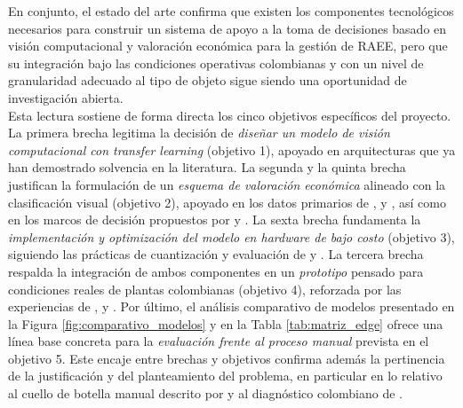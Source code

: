 En conjunto, el estado del arte confirma que existen los componentes tecnológicos necesarios para construir un sistema de apoyo a la toma de decisiones basado en visión computacional y valoración económica para la gestión de RAEE, pero que su integración bajo las condiciones operativas colombianas y con un nivel de granularidad adecuado al tipo de objeto sigue siendo una oportunidad de investigación abierta.\\

Esta lectura sostiene de forma directa los cinco objetivos específicos del proyecto. La primera brecha legitima la decisión de \emph{diseñar un modelo de visión computacional con \textit{transfer learning}} (objetivo 1), apoyado en arquitecturas que ya han demostrado solvencia en la literatura. La segunda y la quinta brecha justifican la formulación de un \emph{esquema de valoración económica} alineado con la clasificación visual (objetivo 2), apoyado en los datos primarios de \cite{cespiLCAPreciousMetals2025}, \cite{wangEwasteRecyclingIntegrated2025} y \cite{qinPreciousMetalRecycling2025}, así como en los marcos de decisión propuestos por \cite{seikhIdentifyingSustainableStrategies2024} y \cite{venegasmarcelModeloProcedimentalPara2020}. La sexta brecha fundamenta la \emph{implementación y optimización del modelo en hardware de bajo costo} (objetivo 3), siguiendo las prácticas de cuantización y evaluación de \cite{zagitovComparativeAnalysisNeural2024} y \cite{alqahtaniBenchmarkingDeepLearning2024}. La tercera brecha respalda la integración de ambos componentes en un \emph{prototipo} pensado para condiciones reales de plantas colombianas (objetivo 4), reforzada por las experiencias de \cite{a.ceronRecyclableWasteClassification2025a}, \cite{ilievEmbeddedSystemEwaste2023} y \cite{p.sLowPowerEdgeAI2026}. Por último, el análisis comparativo de modelos presentado en la Figura \ref{fig:comparativo_modelos} y en la Tabla \ref{tab:matriz_edge} ofrece una línea base concreta para la \emph{evaluación frente al proceso manual} prevista en el objetivo 5. Este encaje entre brechas y objetivos confirma además la pertinencia de la justificación y del planteamiento del problema, en particular en lo relativo al cuello de botella manual descrito por \cite{a.ceronRecyclableWasteClassification2025a} y al diagnóstico colombiano de \cite{jesiddiazbastosImpactoResiduosAparatos2025}.
